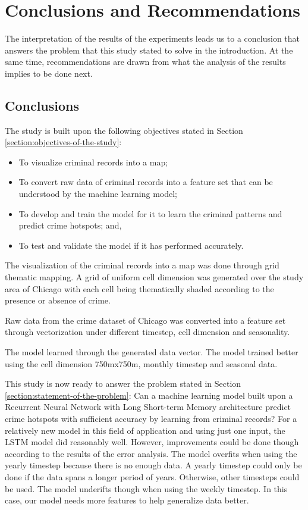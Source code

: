 \section{Conclusions and Recommendations}
    The interpretation of the results of the experiments leads us to a conclusion that answers the problem that this study stated to solve in the introduction. At the same time, recommendations are drawn from what the analysis of the results implies to be done next.

\subsection{Conclusions}
    The study is built upon the following objectives stated in Section \ref{section:objectives-of-the-study}:
    \begin{itemize}
        \item To visualize criminal records into a map;
        \item To convert raw data of criminal records into a feature set that can be understood by the machine learning model;
        \item To develop and train the model for it to learn the criminal patterns and predict crime hotspots; and,
        \item To test and validate the model if it has performed accurately.
    \end{itemize}

    The visualization of the criminal records into a map was done through grid thematic mapping. A grid of uniform cell dimension was generated over the study area of Chicago with each cell being thematically shaded according to the presence or absence of crime.

    Raw data from the crime dataset of Chicago was converted into a feature set through vectorization under different timestep, cell dimension and seasonality.

    The model learned through the generated data vector. The model trained better using the cell dimension 750mx750m, monthly timestep and seasonal data.

    This study is now ready to answer the problem stated in Section \ref{section:statement-of-the-problem}: Can a machine learning model built upon a Recurrent Neural Network with Long Short-term Memory architecture predict crime hotspots with sufficient accuracy by learning from criminal records? For a relatively new model in this field of application and using just one input, the LSTM model did reasonably well. However, improvements could be done though according to the results of the error analysis. The model overfits when using the yearly timestep because there is no enough data. A yearly timestep could only be done if the data spans a longer period of years. Otherwise, other timesteps could be used. The model underifts though when using the weekly timestep. In this case, our model needs more features to help generalize data better.
